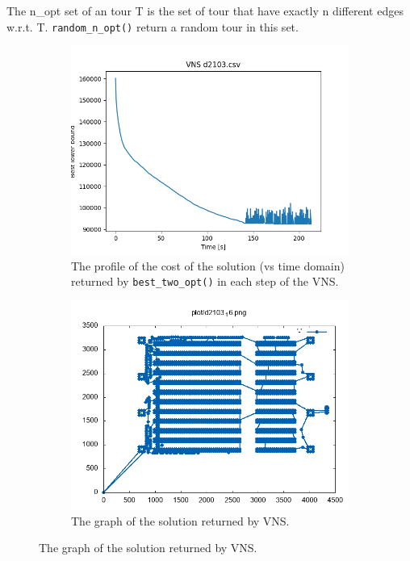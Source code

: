 The n\_opt set of an tour T is the set of tour that have exactly n different edges w.r.t. T. \texttt{random\_n\_opt()} return a random tour in this set.
\begin{figure}[!h]
	\begin{subfigure}{.5\columnwidth}
		\centering
		\includegraphics[width=\columnwidth]{../res/d2103.png}
		\caption{The profile of the cost of the solution (vs time domain) returned by \texttt{best\_two\_opt()} in each step of the VNS.}
		\label{fig:VNS_d2103}
	\end{subfigure}
	\begin{subfigure}{.5\columnwidth}
		\centering
		\includegraphics[width=\columnwidth]{../res/d2103_16.png}
		\caption{The graph of the solution returned by VNS.}

\end{subfigure}
\end{figure}
